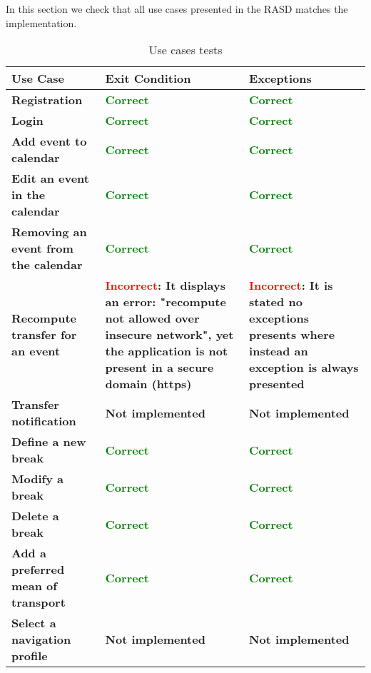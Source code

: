 In this section we check that all use cases presented in the RASD matches the implementation.

\begin{flushleft}

\begin{table}[htp]

\begin{tabular}{p{3cm}|p{5cm}|p{5cm}}
\bf\large Use Case&\bf\large Exit Condition&\bf\large Exceptions\\
\hline
\hline
\textbf{Registration}&\large\bf\textcolor{green}{Correct}&\large\bf\textcolor{green}{Correct}\\
\hline
\textbf{Login}&\large\bf\textcolor{green}{Correct}&\large\bf\textcolor{green}{Correct}\\
\hline
\textbf{Add event to calendar}&\large\bf\textcolor{green}{Correct}&\large\bf\textcolor{green}{Correct}\\
\hline
\textbf{Edit an event in the calendar}&\large\bf\textcolor{green}{Correct}&\large\bf\textcolor{green}{Correct}\\
\hline
\textbf{Removing an event from the calendar}&\large\bf\textcolor{green}{Correct}&\large\bf\textcolor{green}{Correct}\\
\hline
\textbf{Recompute transfer for an event}&\large\bf\textcolor{red}{Incorrect}: It displays an error: "recompute not allowed over insecure network", yet the application is not present in a secure domain (https)&\large\bf\textcolor{red}{Incorrect}: It is stated no exceptions presents where instead an exception is always presented\\
\hline
\textbf{Transfer notiﬁcation}&\large\bf Not implemented&\large\bf Not implemented\\
\hline
\textbf{Deﬁne a new break}&\large\bf\textcolor{green}{Correct}&\large\bf\textcolor{green}{Correct}\\
\hline
\textbf{Modify a break}&\large\bf\textcolor{green}{Correct}&\large\bf\textcolor{green}{Correct}\\
\hline
\textbf{Delete a break}&\large\bf\textcolor{green}{Correct}&\large\bf\textcolor{green}{Correct}\\
\hline
\textbf{Add a preferred mean of transport}&\large\bf\textcolor{green}{Correct}&\large\bf\textcolor{green}{Correct}\\
\hline
\textbf{Select a navigation proﬁle
}&\large\bf Not implemented&\large\bf Not implemented\\
\hline




\end{tabular}

\caption{Use cases tests} 
\label{tab:usecases}

\end{table}

\end{flushleft}

